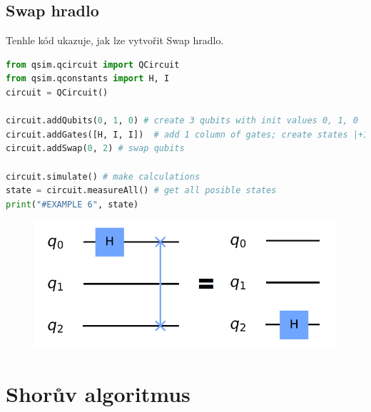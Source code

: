 \documentclass[11pt]{article}
\begin{document}
\subsection{Swap hradlo}
Tenhle kód ukazuje, jak lze vytvořit Swap hradlo.
\begin{lstlisting}[language=Python, caption=Swap gate]
from qsim.qcircuit import QCircuit
from qsim.qconstants import H, I
circuit = QCircuit()

circuit.addQubits(0, 1, 0) # create 3 qubits with init values 0, 1, 0
circuit.addGates([H, I, I])  # add 1 column of gates; create states |+10>
circuit.addSwap(0, 2) # swap qubits

circuit.simulate() # make calculations
state = circuit.measureAll() # get all posible states
print("#EXAMPLE 6", state)
\end{lstlisting}
\begin{figure}[H]
    \includegraphics[scale=.7]{swap_scheme}
    \centering
\end{figure}

\newpage

\section{Shorův algoritmus}
\end{document}
